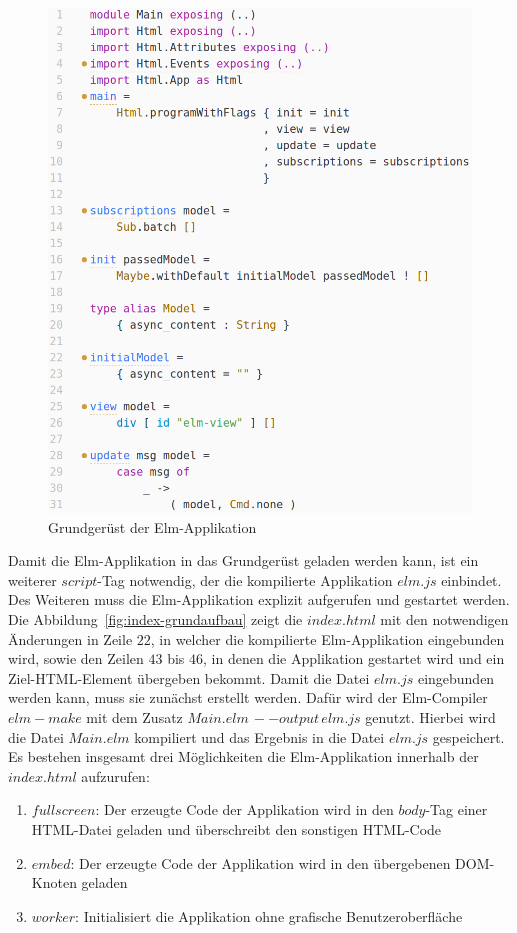 \begin{figure}[p]
\centering
\includegraphics[scale=0.5]{img/elm-grundaufbau-start.png}
\caption{Grundgerüst der Elm-Applikation}\label{fig:elm-grundaufbau-start}
\end{figure}
Damit die Elm-Applikation in das Grundgerüst geladen werden kann, ist ein weiterer $script$-Tag notwendig, der die kompilierte Applikation $elm.js$ einbindet. Des Weiteren muss die Elm-Applikation explizit aufgerufen und gestartet werden. Die Abbildung~\ref{fig:index-grundaufbau} zeigt die $index.html$ mit den notwendigen Änderungen in Zeile $22$, in welcher die kompilierte Elm-Applikation eingebunden wird, sowie den Zeilen $43$ bis $46$, in denen die Applikation gestartet wird und ein Ziel-\ac{HTML}-Element übergeben bekommt. Damit die Datei $elm.js$ eingebunden werden kann, muss sie zunächst erstellt werden. Dafür wird der Elm-Compiler $elm-make$ mit dem Zusatz $Main.elm\,--output\,elm.js$ genutzt. Hierbei wird die Datei $Main.elm$ kompiliert und das Ergebnis in die Datei $elm.js$ gespeichert.
Es bestehen insgesamt drei Möglichkeiten die Elm-Applikation innerhalb der $index.html$ aufzurufen:
\begin{enumerate}
\item{$fullscreen$}: Der erzeugte Code der Applikation wird in den $body$-Tag einer \ac{HTML}-Datei geladen und überschreibt den sonstigen \ac{HTML}-Code

\item{$embed$}: Der erzeugte Code der Applikation wird in den übergebenen DOM-Knoten geladen

\item{$worker$}: Initialisiert die Applikation ohne grafische Benutzeroberfläche
\end{enumerate}
